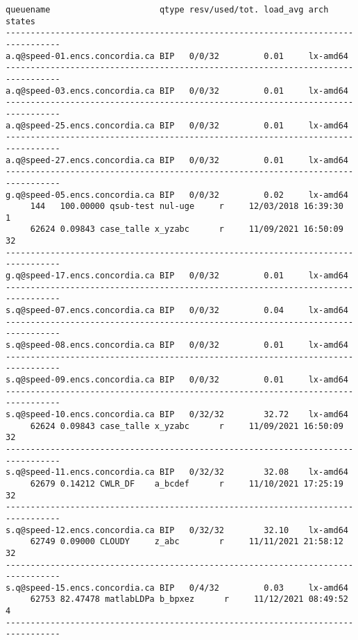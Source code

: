\documentclass{easychair}
\begin{document}
\small
\begin{verbatim}
queuename                      qtype resv/used/tot. load_avg arch          states
---------------------------------------------------------------------------------
a.q@speed-01.encs.concordia.ca BIP   0/0/32         0.01     lx-amd64
---------------------------------------------------------------------------------
a.q@speed-03.encs.concordia.ca BIP   0/0/32         0.01     lx-amd64
---------------------------------------------------------------------------------
a.q@speed-25.encs.concordia.ca BIP   0/0/32         0.01     lx-amd64
---------------------------------------------------------------------------------
a.q@speed-27.encs.concordia.ca BIP   0/0/32         0.01     lx-amd64
---------------------------------------------------------------------------------
g.q@speed-05.encs.concordia.ca BIP   0/0/32         0.02     lx-amd64
     144   100.00000 qsub-test nul-uge     r     12/03/2018 16:39:30    1 
     62624 0.09843 case_talle x_yzabc      r     11/09/2021 16:50:09    32
---------------------------------------------------------------------------------
g.q@speed-17.encs.concordia.ca BIP   0/0/32         0.01     lx-amd64
---------------------------------------------------------------------------------
s.q@speed-07.encs.concordia.ca BIP   0/0/32         0.04     lx-amd64
---------------------------------------------------------------------------------
s.q@speed-08.encs.concordia.ca BIP   0/0/32         0.01     lx-amd64
---------------------------------------------------------------------------------
s.q@speed-09.encs.concordia.ca BIP   0/0/32         0.01     lx-amd64
---------------------------------------------------------------------------------
s.q@speed-10.encs.concordia.ca BIP   0/32/32        32.72    lx-amd64
     62624 0.09843 case_talle x_yzabc      r     11/09/2021 16:50:09    32
---------------------------------------------------------------------------------
s.q@speed-11.encs.concordia.ca BIP   0/32/32        32.08    lx-amd64
     62679 0.14212 CWLR_DF    a_bcdef      r     11/10/2021 17:25:19    32
---------------------------------------------------------------------------------
s.q@speed-12.encs.concordia.ca BIP   0/32/32        32.10    lx-amd64
     62749 0.09000 CLOUDY     z_abc        r     11/11/2021 21:58:12    32
---------------------------------------------------------------------------------
s.q@speed-15.encs.concordia.ca BIP   0/4/32         0.03     lx-amd64
     62753 82.47478 matlabLDPa b_bpxez      r     11/12/2021 08:49:52     4
---------------------------------------------------------------------------------

\end{verbatim}
\end{document}
